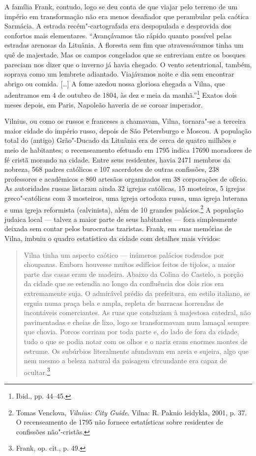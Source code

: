 A família Frank, contudo, logo se deu conta de que viajar pelo terreno
de um império em transformação não era menos desafiador que perambular
pela caótica Sarmácia. A estrada recém"-cartografada era despopulada e
desprovida dos confortos mais elementares. ``Avançávamos tão rápido
quanto possível pelas estradas arenosas da Lituânia. A floresta sem fim
que atravessávamos tinha um quê de majestade. Mas os campos congelados
que se entreviam entre os bosques pareciam nos dizer que o inverno já
havia chegado. O vento setentrional, também, soprava como um lembrete
adiantado. Viajávamos noite e dia sem encontrar abrigo ou comida.
{[}\ldots{}{]} A fome azedou nossa gloriosa chegada a Vilna, que
adentramos em 4 de outubro de 1804, às dez e meia da manhã.''\footnote{Ibid., pp. 44--45.} Exatos dois meses depois, em Paris, Napoleão haveria de se coroar imperador.

Vilnius, ou como os russos e franceses a chamavam, Vilna, tornara"-se a
terceira maior cidade do império russo, depois de São Petersburgo e
Moscou. A população total do (antigo) Grão"-Ducado da Lituânia era de
cerca de quatro milhões e meio de habitantes; o recenseamento efetuado
em 1795 indica 17690 moradores de fé cristã morando na cidade. Entre
seus residentes, havia 2471 membros da nobreza, 568 padres católicos e
107 sacerdotes de outras confissões, 238 professores e acadêmicos e 860
artesãos organizados em 38 corporações de ofício. As autoridades russas
listaram ainda 32 igrejas católicas, 15 mosteiros, 5 igrejas
greco"-católicas com 3 mosteiros, uma igreja ortodoxa russa, uma igreja
luterana e uma igreja reformista (calvinista), além de 10 grandes
palácios.\footnote{Tomas Venclova, \textit{Vilnius: City Guide}. Vilna: R. Paknio leidykla, 2001, p. 37. O recenseamento de 1795 não fornece estatísticas sobre residentes de confissões não"-cristãs.} A população judaica local --- talvez a maior parte de seus habitantes --- fora
simplesmente deixada sem contar pelos burocratas tzaristas. Frank, em
suas memórias de Vilna, imbuiu o quadro estatístico da cidade com
detalhes mais vívidos:

\begin{quote}
Vilna tinha um aspecto caótico --- inúmeros palácios rodeados por
choupanas. Embora houvesse muitos edifícios feitos de tijolos, a maior
parte das casas eram de madeira. Abaixo da Colina do Castelo, a porção
da cidade que se estendia ao longo da confluência dos dois rios era
extremamente suja. O admirável prédio da prefeitura, em estilo italiano,
se erguia numa praça bela e ampla, repleta de barracas horrendas de
incontáveis comerciantes. As ruas que conduziam à majestosa catedral,
não pavimentadas e cheias de lixo, logo se transformavam num lamaçal
sempre que chovia. Porcos corriam por toda parte e, do lado de fora da
cidade, tudo o que se podia notar com os olhos e o nariz eram enormes
montes de estrume. Os subúrbios literalmente afundavam em areia e
sujeira, algo que nem mesmo a beleza natural da paisagem circundante era
capaz de ocultar.\footnote{Frank, op. cit., p. 49.}
\end{quote}

